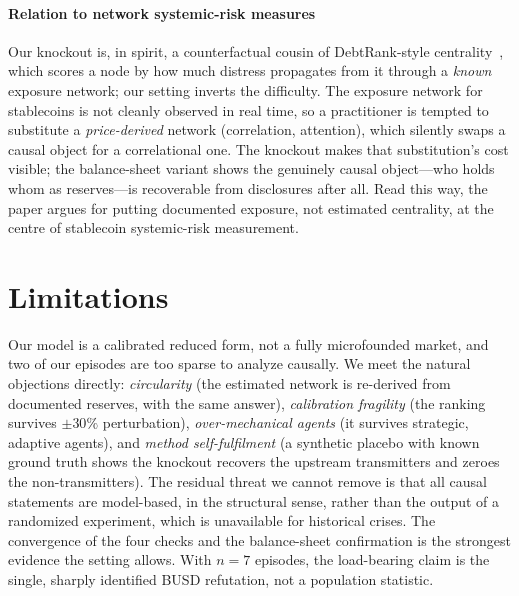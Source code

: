 \documentclass[sigconf,anonymous]{acmart}
\begin{document}
\paragraph{Relation to network systemic-risk measures} Our knockout is, in spirit, a counterfactual
cousin of DebtRank-style centrality~\cite{battiston2012debtrank}, which scores a node by how much
distress propagates from it through a \emph{known} exposure network; our setting inverts the
difficulty. The exposure
network for stablecoins is not cleanly observed in real time, so a practitioner is tempted to substitute
a \emph{price-derived} network (correlation, attention), which silently swaps a causal object for a
correlational one. The knockout makes that substitution's cost visible; the balance-sheet variant
shows the genuinely causal object---who holds whom as reserves---is recoverable from disclosures
after all. Read this way, the paper argues for putting documented exposure, not estimated
centrality, at the centre of stablecoin systemic-risk measurement.

\section{Limitations}
Our model is a calibrated reduced form, not a fully microfounded market, and two of our episodes are
too sparse to analyze causally. We meet the natural objections directly: \emph{circularity} (the
estimated network is re-derived from documented reserves, with the same answer), \emph{calibration
fragility} (the ranking survives $\pm30\%$ perturbation),
\emph{over-mechanical agents} (it survives strategic, adaptive agents), and \emph{method
self-fulfilment} (a synthetic placebo with known ground truth shows the knockout recovers the
upstream transmitters and zeroes the non-transmitters). The residual threat we cannot remove is that all causal
statements are model-based, in the structural sense, rather than the output of a randomized
experiment, which is unavailable for historical crises. The convergence of the four checks and the
balance-sheet confirmation is the strongest evidence the setting allows. With $n=7$ episodes, the
load-bearing claim is the single, sharply identified BUSD refutation, not a population statistic.
\end{document}
